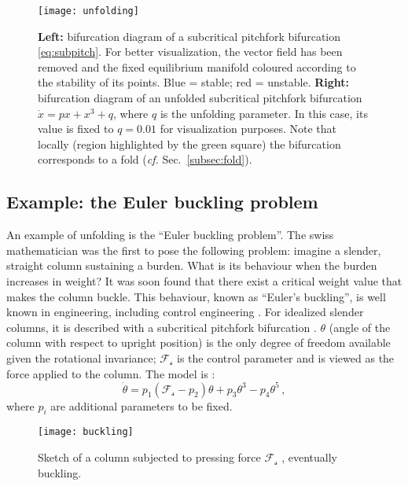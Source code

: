 \begin{figure}[h!]
	\centering
	\texttt{[image: unfolding]}
	\caption{\small \textbf{Left:} bifurcation diagram of a subcritical pitchfork bifurcation \ref{eq:subpitch}. For better visualization, the vector field has been removed and the fixed equilibrium manifold coloured according to the stability of its points. Blue = stable; red = unstable. \textbf{Right:} bifurcation diagram of an unfolded subcritical pitchfork bifurcation $\dot{x} = px + x^3 + q$, where $q$ is the unfolding parameter. In this case, its value is fixed to $q = 0.01$ for visualization purposes. Note that locally (region highlighted by the green square) the bifurcation corresponds to a fold (\textit{cf.} Sec.~\ref{subsec:fold}).} 
	\label{fig:subpitch_bis}
\end{figure}




\tocless\subsection{Example: the Euler buckling problem}
An example of unfolding is the ``Euler buckling problem''. The swiss mathematician was the first to pose the following problem: imagine a slender, straight column sustaining a burden. What is its behaviour when the burden increases in weight? It was soon found that there exist a critical weight value that makes the column buckle. This behaviour, known as ``Euler's buckling'', is well known in engineering, including control engineering \citep{venkadesan2007manipulating}. For idealized slender columns, it is described with a subcritical pitchfork bifurcation \cite{thompson2011predicting,kuehn2013mathematical}. $\theta$ (angle of the column with respect to upright position) is the only degree of freedom available given the rotational invariance; $\mathcal{F_s}$ is the control parameter and is viewed as the force applied to the column. The model is \citep{venkadesan2007manipulating}:
\begin{equation}
	\dot{\theta} = p_1(\mathcal{F_s}-p_2)\theta + p_3\theta^3 - p_4\theta^5 \, ,
\end{equation}
where $p_i$ are additional parameters to be fixed.

\begin{figure}[h!]
	\centering
	\texttt{[image: buckling]}
	\caption{Sketch of a column subjected to pressing force $\mathcal{F_s}$ \citep{kuehn2013mathematical}, eventually buckling. }
	\label{fig:buckling}
\end{figure}

